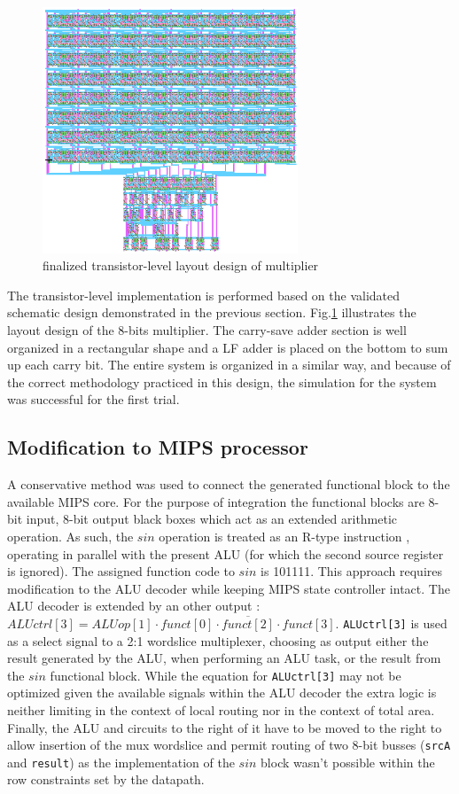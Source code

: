 \documentclass[10pt,journal]{IEEEtran}
\begin{document}
\begin{figure}[h]
\centering
\includegraphics[width=3in]{finalized_transistor_design.png}
\caption{finalized transistor-level layout design of multiplier}
\label{finalized_transistor_design}
\end{figure}


The transistor-level implementation is performed based on the validated schematic design demonstrated in the previous section. Fig.\ref{finalized_transistor_design} illustrates the layout design of the 8-bits multiplier. The carry-save adder section is well organized in a rectangular shape and a LF adder is placed on the bottom to sum up each carry bit. The entire system is organized in a similar way, and because of the correct methodology practiced in this design, the simulation for the system was successful for the first trial.

\subsection{Modification to MIPS processor}
A conservative method was used to connect the generated functional block to the available MIPS core. For the purpose of integration the functional blocks are 8-bit input, 8-bit output black boxes which act as an extended arithmetic operation. As such, the $sin$ operation  is treated as an R-type instruction , operating in parallel with the present ALU (for which the second source register is ignored). The assigned function code to $sin$ is 101111. This approach requires modification to the ALU decoder while keeping MIPS state controller intact. The ALU decoder is extended by an other output : \texttt{$ALUctrl[3] =  ALUop[1] \cdot \overline{funct[0] \cdot funct[2] \cdot funct[3]}$}. \texttt{ALUctrl[3]} is used as a select signal to a 2:1 wordslice multiplexer, choosing as output either the result generated by the ALU, when performing an ALU task, or the result from the $sin$ functional block. While the equation for \texttt{ALUctrl[3]} may not be optimized given the available signals within the ALU decoder the extra logic is neither limiting in the context of local routing nor in the context of total area. Finally, the ALU and circuits to the right of it have to be moved to the right to allow insertion of the mux wordslice and permit routing of two 8-bit busses (\texttt{srcA} and \texttt{result}) as the implementation of the $sin$ block wasn't possible within the row constraints set by the datapath.
\end{document}
